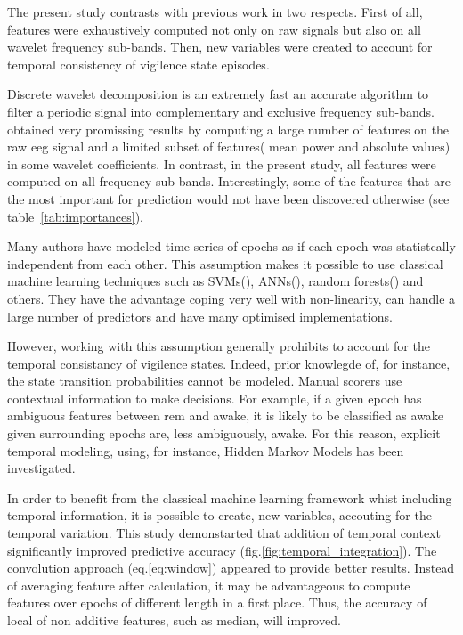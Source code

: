 The present study contrasts with previous work in two respects.
First of all, features were exhaustively computed not only on raw signals but also on all wavelet frequency sub-bands.
Then, new variables were created to account for temporal consistency of vigilence state episodes.

Discrete wavelet decomposition is an extremely fast an accurate algorithm to filter a periodic signal into complementary and exclusive
frequency sub-bands.
 obtained very promissing results by computing a large number of features on the raw \gls{eeg} signal
and a limited subset of features(\ie{} mean power and absolute values) in some wavelet coefficients.
In contrast, in the present study, all features were computed on all frequency sub-bands.
Interestingly, some of the features that are the most important for prediction would not have 
been discovered otherwise (see table~\ref{tab:importances}).

Many authors have modeled time series of epochs as if each epoch was statistcally independent from each other. 
This assumption makes it possible to use classical machine learning techniques such as
SVMs(\citationneeded{}), ANNs(\citationneeded{}), random forests(\citationneeded{}) and others.
They have the advantage coping very well with non-linearity, can handle a large number of predictors and have many optimised implementations.

However, working with this assumption generally prohibits to account for the temporal consistancy of vigilence states.
Indeed, prior knowlegde of, for instance, the state transition probabilities cannot be modeled.
Manual scorers use contextual information to make decisions.
For example, if a given epoch has ambiguous features between \gls{rem} and awake,
it is likely to be classified as awake given surrounding epochs are, less ambiguously, awake.
For this reason, explicit temporal modeling, using, for instance, Hidden Markov Models has been investigated\citationneeded{}.

In order to benefit from the classical machine learning 
framework whist including temporal information,
it is possible to create, new variables, accouting for the temporal variation\citationneeded{}.
This study demonstarted that addition of temporal context significantly improved predictive accuracy (fig.\ref{fig:temporal_integration}).
The convolution approach (eq.\ref{eq:window}) appeared to provide better results.
Instead of averaging feature after calculation, it may be advantageous to compute features over epochs of different length in a first place.
Thus, the accuracy of local of non additive features, such as median, will improved.

